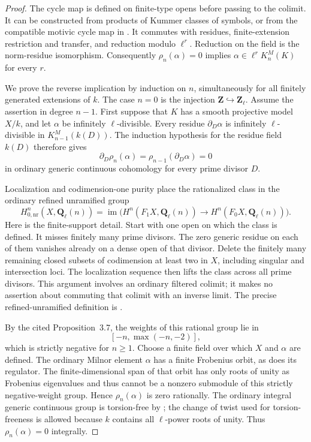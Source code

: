 \begin{proof}
The cycle map is defined on finite-type opens before passing to the
colimit.  It can be constructed from products of Kummer classes of
symbols, or from the compatible motivic cycle map in
\citet[\S6.1, equations~(6.2)--(6.4)]{BCTSchreiederDivisibility2026}.
It commutes with residues, finite-extension restriction and transfer,
and reduction modulo $\ell^r$.  Reduction on the field is the
norm-residue isomorphism.  Consequently $\rho_n(\alpha)=0$ implies
$\alpha\in\ell^rK_n^M(K)$ for every $r$.

We prove the reverse implication by induction on $n$, simultaneously
for all finitely generated extensions of $k$.  The case $n=0$ is the
injection $\mathbf Z\hookrightarrow\mathbf Z_\ell$.
Assume the assertion in degree $n-1$.  First suppose that $K$ has a
smooth projective model $X/k$, and let $\alpha$ be infinitely
$\ell$-divisible.  Every residue $\partial_D\alpha$ is infinitely
$\ell$-divisible in $K_{n-1}^M(k(D))$.  The induction hypothesis for
the residue field $k(D)$ therefore gives
\[
 \partial_D\rho_n(\alpha)
       =\rho_{n-1}(\partial_D\alpha)=0
\]
in ordinary generic continuous cohomology for every prime divisor $D$.

Localization and codimension-one purity place the rationalized class
in the ordinary refined unramified group
\[
 H^n_{0,\mathrm{nr}}(X,\mathbf Q_\ell(n))
 =\operatorname{im}\bigl(
 H^n(F_1X,\mathbf Q_\ell(n))\longrightarrow
 H^n(F_0X,\mathbf Q_\ell(n))\bigr).
\]
Here is the finite-support detail.  Start with one open on which the
class is defined.  It misses finitely many prime divisors.  The zero
generic residue on each of them vanishes already on a dense open of
that divisor.  Delete the finitely many remaining closed subsets of
codimension at least two in $X$, including singular and intersection
loci.  The localization sequence then lifts the class across all
prime divisors.  This argument involves an ordinary filtered
colimit; it makes no assertion about commuting that colimit with an
inverse limit.  The precise refined-unramified definition is
\citet[equations~(2.7)--(2.8), p.~11]{BCTSchreiederDivisibility2026}.

By the cited Proposition~3.7, the weights of this rational group lie
in
\[
 [-n,\max(-n,-2)],
\]
which is strictly negative for $n\ge1$.  Choose a finite field over
which $X$ and $\alpha$ are defined.  The ordinary Milnor element
$\alpha$ has a finite Frobenius orbit, as does its regulator.  The
finite-dimensional span of that orbit has only roots of unity as
Frobenius eigenvalues and thus cannot be a nonzero submodule of this
strictly negative-weight group.  Hence $\rho_n(\alpha)$ is zero
rationally.  The ordinary integral generic continuous group is
torsion-free by \citet[Theorem~2.2 and Corollary~2.3,
pp.~6--7]{BSchreiederMilnorTate2026}; the change of twist used for
torsion-freeness is allowed because $k$ contains all $\ell$-power
roots of unity.  Thus $\rho_n(\alpha)=0$ integrally.


\end{proof}
